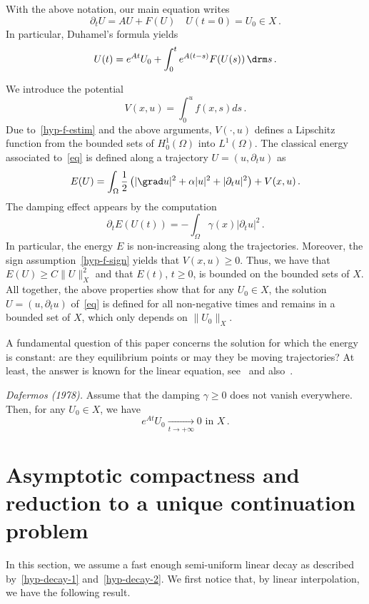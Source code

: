 With the above notation, our main equation writes
\begin{equation}\label{eq2}
\partial_t U=AU + F(U)\quad U(t=0)=U_0\in X\,.
\end{equation}
In particular, Duhamel's formula yields
\[
U(t)=e^{At}U_0 + \int_0^t e^{A(t-s)}F(U(s))\,\drm s\,.
\]

We introduce the potential
\[
V(x,u)=\int_0^u f(x,s)ds\,.
\]
Due to~\eqref{hyp-f-estim} and the above arguments, $V(\cdot,u)$ defines a Lipschitz function from the bounded sets of $H^1_0(\Omega)$ into $L^1(\Omega)$. The classical energy associated to~\eqref{eq} is defined along a trajectory $U=(u,\partial_t u)$ as
\[
E(U)= \int_\Omega \frac12\left(|\grad u|^2+\alpha |u|^2+|\partial_t u|^2\right) +
V(x,u)\,.
\]
The damping effect appears by the computation
\begin{equation}\label{eq-deriv-E}
\partial_t E(U(t))= - \int_\Omega \gamma(x)|\partial_t u |^2\,.
\end{equation}
In particular, the energy $E$ is non-increasing along the trajectories. Moreover, the sign assumption~\eqref{hyp-f-sign} yields that $V(x,u)\geq 0$. Thus, we have that $E(U)\geq C \|U\|_X^2$ and that $E(t)$, $t\geq 0$, is bounded on the bounded sets of $X$. All together, the above properties show that for any $U_0\in X$, the solution $U=(u,\partial_t u)$ of~\eqref{eq} is defined for all non-negative times and remains in a bounded set of $X$, which only depends on $\|U_0\|_X$.

A fundamental question of this paper concerns the solution for which the energy is constant: are they equilibrium points or may they be moving trajectories? At least, the answer is known for the linear equation, see~\cite{Dafermos} and also~\cite{Haraux}.

\begin{theo}\label{th-stab-linear}
\emph{Dafermos (1978).}
Assume that the damping $\gamma\geq 0$ does not vanish everywhere. Then, for any $U_0\in X$, we have
\[
e^{At}U_0\xrightarrow[t\longrightarrow +\infty]{} 0\text{ in }X\,.
\]
\end{theo}



\section{Asymptotic compactness and reduction to a unique continuation problem}\label{section-asymp-compact}

In this section, we assume a fast enough semi-uniform linear decay as described by~\eqref{hyp-decay-1} and~\eqref{hyp-decay-2}. We first notice that, by linear interpolation, we have the following result.


